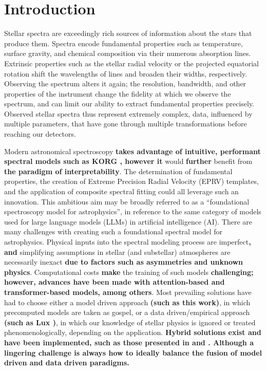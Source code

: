 \documentclass[twocolumn, linenumbers]{aastex631}
\begin{document}
\section{Introduction}
Stellar spectra are exceedingly rich sources of information about the stars that produce them.
Spectra encode fundamental properties such as temperature, surface gravity, and chemical composition via their numerous absorption lines.
Extrinsic properties such as the stellar radial velocity or the projected equatorial rotation shift the wavelengths of lines and broaden their widths, respectively.
Observing the spectrum alters it again; the resolution, bandwidth, and other properties of the instrument change the fidelity at which we observe the spectrum, and can limit our ability to extract fundamental properties precisely.
Observed stellar spectra thus represent extremely complex, data, influenced by multiple parameters, that have gone through multiple transformations before reaching our detectors.

Modern astronomical spectroscopy \textbf{takes advantage of intuitive, performant spectral models such as KORG \citep{korg}, however it} would \textbf{further} benefit from \textbf{the paradigm of interpretability}.
The determination of fundamental properties, the creation of Extreme Precision Radial Velocity (EPRV) templates, and the application of composite spectral fitting could all leverage such an innovation.
This ambitious aim may be broadly referred to as a ``foundational spectroscopy model for astrophysics'', in reference to the same category of models used for large language models (LLMs) in artificial intelligence (AI).
There are many challenges with creating such a foundational spectral model for astrophysics.
Physical inputs into the spectral modeling process are imperfect\textbf{, and} simplifying assumptions in stellar (and substellar) atmospheres are necessarily inexact \textbf{due to factors such as asymmetries and unknown physics}.
Computational costs \textbf{make} the training of such models \textbf{challenging; however, advances have been made with attention-based \citep{foundation_attention} and transformer-based \citep{foundation_transformer} models, among others}.
Most prevailing solutions have had to choose either a model driven approach \textbf{(such as this work)}, in which precomputed models are taken as gospel, or a data driven/empirical approach \textbf{(such as Lux \citep{lux})}, in which our knowledge of stellar physics is ignored or treated phenomenologically, depending on the application.
\textbf{Hybrid solutions exist and have been implemented, such as those presented in \citealt{leung2019} and \citealt{rains2024}.
Although a lingering challenge is always how to ideally balance the fusion of model driven and data driven paradigms.}
\end{document}
